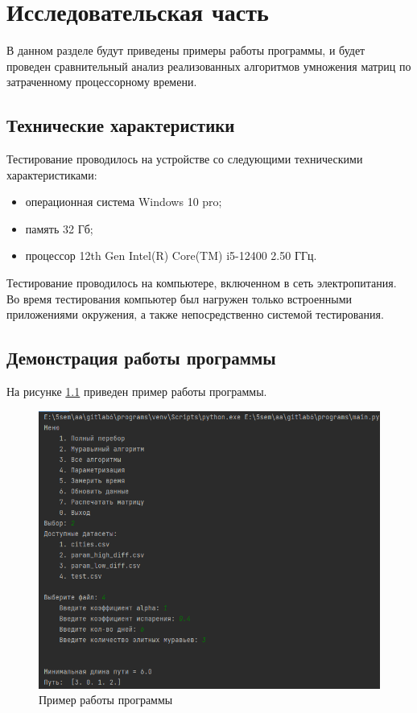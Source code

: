 \chapter{Исследовательская часть}

В данном разделе будут приведены примеры работы программы, и будет проведен сравнительный анализ реализованных алгоритмов умножения матриц по затраченному процессорному времени.

\section{Технические характеристики}

Тестирование проводилось на устройстве со следующими техническими характеристиками:

\begin{itemize}
	\item операционная система Windows 10 pro;
	\item память  32 Гб;
	\item процессор  12th Gen Intel(R) Core(TM) i5-12400 2.50 ГГц.
\end{itemize}

Тестирование проводилось на компьютере, включенном в сеть электропитания. Во время тестирования компьютер был нагружен только встроенными приложениями окружения, а также непосредственно системой тестирования.

\clearpage

\section{Демонстрация работы программы}

На рисунке \ref{img:example} приведен пример работы программы.

\begin{figure}[H]
	\begin{center}
		\includegraphics[scale=0.7]{img/example.png}
	\end{center}
	\captionsetup{justification=centering}
	\caption{Пример работы программы}
	\label{img:example}
\end{figure}

